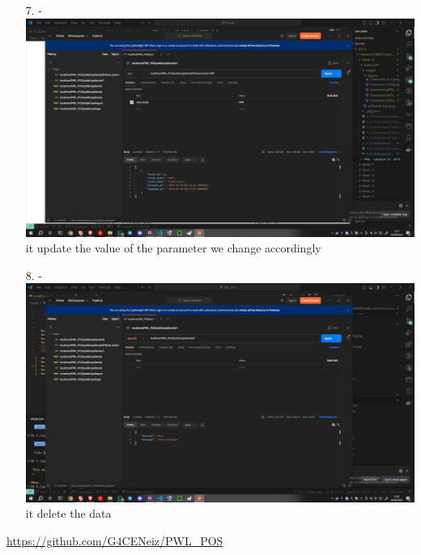 \documentclass[12pt,titlepage]{article}
\begin{document}
\begin{enumerate}
    \item[7.] - \\ \includegraphics[width=.9\textwidth]{images/figures/Screenshot (483).png} \\ it update the value of the parameter we change accordingly
    \item[8.] - \\ \includegraphics[width=.9\textwidth]{images/figures/Screenshot (484).png} \\ it delete the data
\end{enumerate}
\url{https://github.com/G4CENeiz/PWL_POS}
\end{document}
